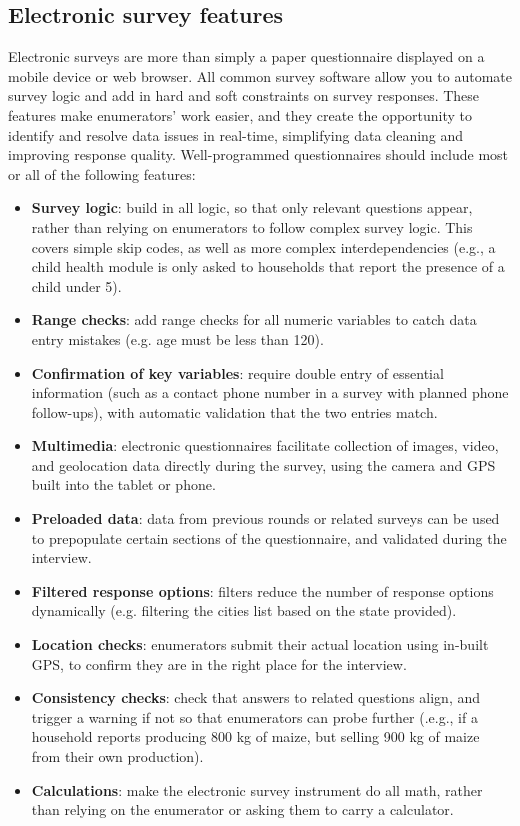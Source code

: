 \subsection{Electronic survey features}
Electronic surveys are more than simply a paper questionnaire displayed on a mobile device or web browser.
All common survey software allow you to automate survey logic and add in hard and soft constraints on survey responses.
These features make enumerators' work easier, and they create the opportunity to identify and resolve data issues in real-time, simplifying data cleaning and improving response quality.
Well-programmed questionnaires should include most or all of the following features:

\begin{itemize}
	\item{\textbf{Survey logic}}: build in all logic, so that only relevant questions appear, rather than relying on enumerators to follow complex survey logic. This covers simple skip codes, as well as more complex interdependencies (e.g., a child health module is only asked to households that report the presence of a child under 5).
	\item{\textbf{Range checks}}:  add range checks for all numeric variables to catch data entry mistakes (e.g. age must be less than 120).
	\item{\textbf{Confirmation of key variables}}: require double entry of essential information (such as a contact phone number in a survey with planned phone follow-ups), with automatic validation that the two entries match.
	\item{\textbf{Multimedia}}: electronic questionnaires facilitate collection of images, video, and geolocation data directly during the survey, using the camera and GPS built into the tablet or phone.
	\item{\textbf{Preloaded data}}: data from previous rounds or related surveys can be used to prepopulate certain sections of the questionnaire, and validated during the interview.
	\item{\textbf{Filtered response options}}: filters reduce the number of response options dynamically (e.g. filtering the cities list based on the state provided).
	\item{\textbf{Location checks}}: enumerators submit their actual location using in-built GPS, to confirm they are in the right place for the interview.
	\item{\textbf{Consistency checks}}: check that answers to related questions align, and trigger a warning if not so that enumerators can probe further (.e.g., if a household reports producing 800 kg of maize, but selling 900 kg of maize from their own production).
	\item{\textbf{Calculations}}: make the electronic survey instrument do all math, rather than relying on the enumerator or asking them to carry a calculator.
\end{itemize}

